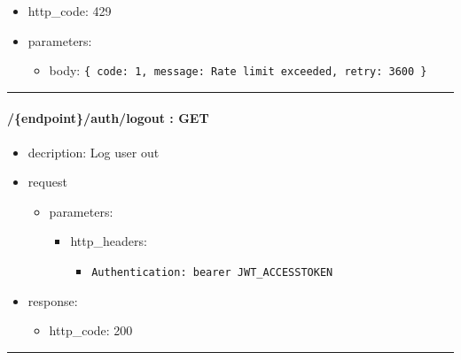 \documentclass[
]{article}
\begin{document}
\begin{itemize}
  \begin{itemize}
  \item
    http\_code: 429
  \item
    parameters:

    \begin{itemize}
    \item
      body: \texttt{\{
      \textquotesingle{}code\textquotesingle{}:\ 1,\ 
      \textquotesingle{}message\textquotesingle{}:\ \textquotesingle{}Rate\ limit\ exceeded\textquotesingle{},\ 
      \textquotesingle{}retry\textquotesingle{}:\ 3600
      \}}
    \end{itemize}
  \end{itemize}
\end{itemize}

\begin{center}\rule{0.5\linewidth}{0.5pt}\end{center}

\hypertarget{header-n60664}{%
\paragraph{/\{endpoint\}/auth/logout : GET}\label{header-n60664}}

\begin{itemize}
\item
  decription: Log user out
\item
  request

  \begin{itemize}
  \item
    parameters:

    \begin{itemize}
    \item
      http\_headers:

      \begin{itemize}
      \item
        \texttt{Authentication:\ \textquotesingle{}bearer\ JWT\_ACCESSTOKEN\textquotesingle{}}
      \end{itemize}
    \end{itemize}
  \end{itemize}
\item
  response:

  \begin{itemize}
  \item
    http\_code: 200
  \end{itemize}
\end{itemize}

\begin{center}\rule{0.5\linewidth}{0.5pt}\end{center}
\end{document}
